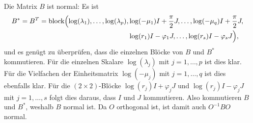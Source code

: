 \documentclass[a4paper, 10pt, numbers=noenddot]{scrartcl}
\begin{document}
Die Matrix $B$ ist normal:
Es ist
\begin{align*}
    B^*
  = B^T
  = \operatorname{\operatorname{block}}\Bigl(  \log(\lambda_1), \dotsc, \log(\lambda_p),
                 &\log(-\mu_1) I + \frac{\pi}{2} J, \dotsc, \log(-\mu_q) I + \frac{\pi}{2} J, \\
                 & \log(r_1) I - \varphi_1 J, \dotsc, \log(r_s) I - \varphi_s J                \Bigr),
\end{align*}
und es genügt zu überprüfen, dass die einzelnen Blöcke von $B$ und $B^*$ kommutieren.
Für die einzelnen Skalare $\log(\lambda_j)$ mit $j = 1, \dotsc, p$ ist dies klar.
Für die Vielfachen der Einheitsmatrix $\log(-\mu_j)$ mit $j = 1, \dotsc, q$ ist dies ebenfalls klar.
Für die $(2 \times 2)$-Blöcke $\log(r_j) I + \varphi_j J$ und $\log(r_j) I - \varphi_j J$ mit $j = 1, \dotsc, s$ folgt dies daraus, dass $I$ und $J$ kommutieren.
Also kommutieren $B$ und $B^*$, weshalb $B$ normal ist.
Da $O$ orthogonal ist, ist damit auch $O^{-1} B O$ normal.
\end{document}
